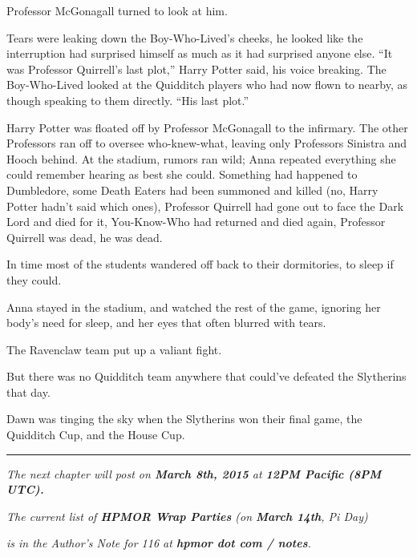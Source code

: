 Professor McGonagall turned to look at him.

Tears were leaking down the Boy-Who-Lived's cheeks, he looked like the interruption had surprised himself as much as it had surprised anyone else. ``It was Professor Quirrell's last plot,'' Harry Potter said, his voice breaking. The Boy-Who-Lived looked at the Quidditch players who had now flown to nearby, as though speaking to them directly. ``His last plot.''

Harry Potter was floated off by Professor McGonagall to the infirmary. The other Professors ran off to oversee who-knew-what, leaving only Professors Sinistra and Hooch behind. At the stadium, rumors ran wild; Anna repeated everything she could remember hearing as best she could. Something had happened to Dumbledore, some Death Eaters had been summoned and killed (no, Harry Potter hadn't said which ones), Professor Quirrell had gone out to face the Dark Lord and died for it, You-Know-Who had returned and died again, Professor Quirrell was dead, he was dead.

In time most of the students wandered off back to their dormitories, to sleep if they could.

Anna stayed in the stadium, and watched the rest of the game, ignoring her body's need for sleep, and her eyes that often blurred with tears.

The Ravenclaw team put up a valiant fight.

But there was no Quidditch team anywhere that could've defeated the Slytherins that day.

Dawn was tinging the sky when the Slytherins won their final game, the Quidditch Cup, and the House Cup.

\begin{center}\rule{3in}{0.4pt}\end{center}

\emph{The next chapter will post on \textbf{March 8th, 2015} at \textbf{12PM Pacific (8PM UTC).}}

\emph{The current list of \textbf{HPMOR Wrap Parties} (on \textbf{March 14th}, Pi Day)}

\emph{is in the Author's Note for 116 at \textbf{hpmor dot com / notes}.}
